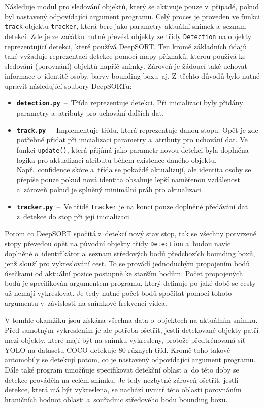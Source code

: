 Následuje modul pro sledování objektů, který se aktivuje pouze v~případě, pokud byl nastavený odpovídající argument programu. Celý proces je proveden ve funkci \texttt{track} objektu \texttt{tracker}, která bere jako parametry aktuální snímek a~seznam detekcí. Zde je ze začátku nutné převést objekty ze třídy \texttt{Detection} na objekty reprezentující detekci, které používá DeepSORT. Ten kromě základních údajů také vyžaduje reprezentaci detekce pomocí mapy příznaků, kterou používá ke sledování (porovnání) objektů napříč snímky. Zároveň je žádoucí také uchovat informace o~identitě osoby, barvy bounding boxu~aj. Z~těchto důvodů bylo nutné upravit následující soubory DeepSORTu:
\begin{itemize}
    \item \texttt{\textbf{detection.py}}~--~Třída reprezentuje detekci. Při inicializaci byly přidány parametry a~atributy pro uchování dalších dat.
    \item \texttt{\textbf{track.py}}~--~Implementuje třídu, která reprezentuje danou stopu. Opět je zde potřebné přidat při inicializaci parametry a~atributy pro uchování dat. Ve funkci \texttt{update()}, která přijímá jako parametr novou detekci byla doplněna logika pro aktualizaci atributů během existence daného objektu. Např.~confidence skóre a~třída se pokaždé aktualizují, ale identita osoby se přepíše pouze pokud nová identita obsahuje lepší naměřenou vzdálenost a~zároveň pokud je splněný minimální práh pro aktualizaci.
    \item \texttt{\textbf{tracker.py}}~--~Ve třídě \texttt{Tracker} je na konci pouze doplněné předávání dat z~detekce do stop při její inicializaci.
\end{itemize}

Potom co DeepSORT spočítá z~detekcí nový stav stop, tak se všechny potvrzené stopy převedou opět na původní objekty třídy \texttt{Detection} a~budou navíc doplněné o~identifikátor a~seznam středových bodů předchozích bounding boxů, jenž slouží pro vykreslování cest. To se provádí jednoduchým propojením bodů úsečkami od aktuální pozice postupně ke starším bodům. Počet propojených bodů je specifikován argumentem programu, který definuje po jaké době se cesty už nemají vykreslovat. Je tedy nutné počet bodů spočítat pomocí tohoto argumentu v~závislosti na snímkové frekvenci videa.

V tomhle okamžiku jsou získána všechna data o~objektech na aktuálním snímku. Před samotným vykreslením je ale potřeba ošetřit, jestli detekované objekty patří mezi objekty, které mají být na snímku vykresleny, protože předtrénovaná síť YOLO na datasetu COCO detekuje 80 různých tříd. Kromě toho takové automobily se detekují potom, co je nastavený odpovídající argument programu. Dále také program umožňuje specifikovat detekční oblast a~do této doby se detekce prováděla na celém snímku. Je tedy nezbytné zároveň ošetřit, jestli detekce, která má být vykreslena, se nachází uvnitř této oblasti porovnáním hraničních hodnot oblasti a~souřadnic středového bodu bounding boxu.


